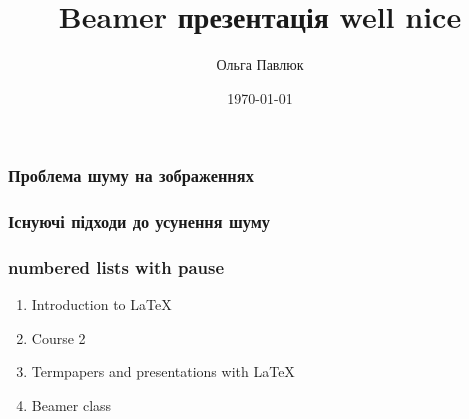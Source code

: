 \documentclass[12pt]{beamer}
\begin{document}
\title{Beamer презентація well nice}  
\author{Ольга Павлюк}
\date{\today} 

\begin{frame}
	\titlepage
\end{frame}

\begin{frame}\frametitle{Проблема шуму на зображеннях}
\end{frame}

\begin{frame}\frametitle{Існуючі підходи до усунення шуму}
\end{frame}

\begin{frame}\frametitle{}
\end{frame}

\begin{frame}\frametitle{}
\end{frame}

\begin{frame}\frametitle{}
\end{frame}

\begin{frame}\frametitle{}
\end{frame}

\begin{frame}\frametitle{}
\end{frame}

\begin{frame}\frametitle{}
\end{frame}

\begin{frame}\frametitle{}
\end{frame}

\begin{frame}\frametitle{}
\end{frame}

\begin{frame}\frametitle{numbered lists with pause}
	\begin{enumerate}
		\item Introduction to  \LaTeX \pause 
		\item Course 2 \pause 
		\item Termpapers and presentations with \LaTeX \pause 
		\item Beamer class
	\end{enumerate}
\end{frame}
\end{document}
